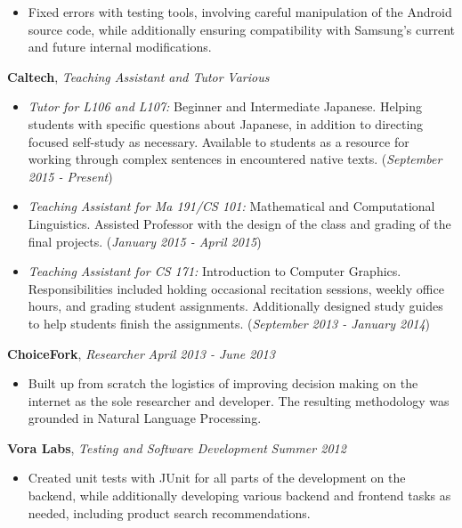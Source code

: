 \documentclass[9pt]{article}
\newenvironment{changemargin}[2]{%
  \begin{list}{}{%
    \setlength{\topsep}{0pt}%
    \setlength{\leftmargin}{#1}%
    \setlength{\rightmargin}{#2}%
    \setlength{\listparindent}{\parindent}%
    \setlength{\itemindent}{\parindent}%
    \setlength{\parsep}{\parskip}%
  }%
  \item[]}{\end{list}
}
\newenvironment{body} {
	\vspace*{-16pt}
	\begin{changemargin}{-0.25in}{-0.5in}
  }	
	{\end{changemargin}
}
\begin{document}
\begin{body}
\begin{itemize}
	\item Fixed errors with testing tools, involving careful manipulation of the Android source code, while additionally ensuring compatibility with Samsung's current and future internal modifications.
	\end{itemize}
	\newpage
	\vspace*{1pt}
	\textbf{Caltech}, \emph{Teaching Assistant and Tutor} \hfill \emph{Various}\\
	\vspace*{-3pt}
	\begin{itemize} \itemsep -0pt %
	\item \textit{Tutor for L106 and L107:} Beginner and Intermediate Japanese. Helping students with specific questions about Japanese, in addition to directing focused self-study as necessary. Available to students as a resource for working through complex sentences in encountered native texts. (\textit{September 2015 - Present})
	\item \textit{Teaching Assistant for Ma 191/CS 101:} Mathematical and Computational Linguistics. Assisted Professor with the design of the class and grading of the final projects. (\textit{January 2015 - April 2015})
	\item \textit{Teaching Assistant for CS 171:} Introduction to Computer Graphics. Responsibilities included holding occasional recitation sessions, weekly office hours, and grading student assignments. Additionally designed study guides to help students finish the assignments. (\textit{September 2013 - January 2014})	
	\end{itemize}
	\vspace*{5pt}
	\textbf{ChoiceFork}, \emph{Researcher} \hfill \emph{April 2013 - June 2013}\\
	\vspace*{-3pt}
	\begin{itemize} \itemsep -0pt  %
		\item Built up from scratch the logistics of improving decision making on the internet as the sole researcher and developer. The resulting methodology was grounded in Natural Language Processing.
	\end{itemize}
\smallskip
	\vspace*{1pt}
	\textbf{Vora Labs}, \emph{Testing and Software Development} \hfill \emph{Summer 2012}\\
	\vspace*{-3pt}
	\begin{itemize} \itemsep -0pt  %
		\item Created unit tests with JUnit for all parts of the development on the backend, while additionally developing various backend and frontend tasks as needed, including product search recommendations.
	\end{itemize}
	\vspace*{-3pt}
\smallskip

	
\end{body}
\end{document}
